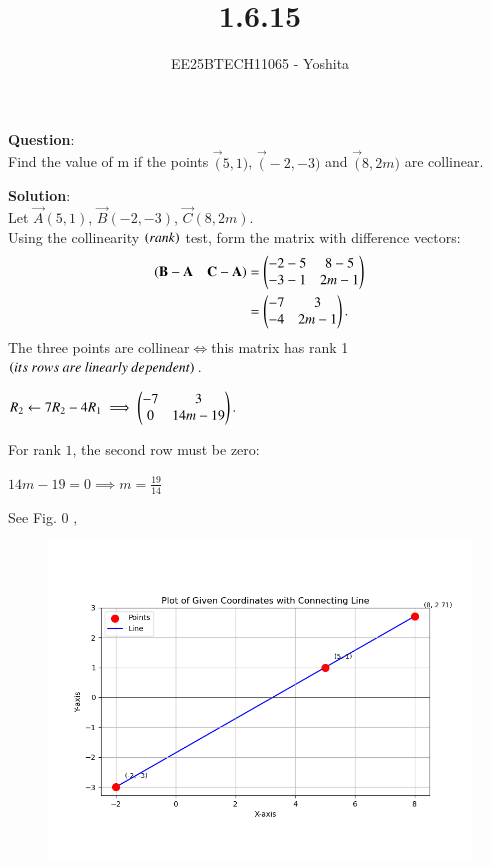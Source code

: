 \documentclass[journal]{IEEEtran}
\begin{document}

\vspace{3cm}

\title{1.6.15}
\author{EE25BTECH11065 - Yoshita}
{\let\newpage\relax\maketitle}

\renewcommand{\thefigure}{\theenumi}
\renewcommand{\thetable}{\theenumi}
\setlength{\intextsep}{10pt} %
\textbf{Question}:\\
    Find the value of m if the points $\vec(5,1)$, $\vec(-2,-3)$ and $\vec(8,2m)$ are collinear.\\
\bigskip

\textbf{Solution}:\\
Let $\vec{A}(5,1)$, $\vec{B}(-2,-3)$, $\vec{C}(8,2m)$.
\\
Using the collinearity $\left(rank\right)$ test, form the matrix with difference vectors:
\begin{align*}
    (\mathbf{B}-\mathbf{A} \quad \mathbf{C}-\mathbf{A}) &= \begin{pmatrix}-2-5 & 8-5 \\ -3-1 & 2m-1\end{pmatrix} \\
    &= \begin{pmatrix}-7 & 3 \\ -4 & 2m-1\end{pmatrix}.
\end{align*}
The three points are collinear$\iff$this matrix has rank 1 $\brak{its\ rows\ are\ linearly\ dependent}$.\\
\begin{center}
 $R_2 \leftarrow 7R_2 - 4R_1 \implies  \begin{pmatrix}-7 & 3 \\ 0 & 14m-19\end{pmatrix}.$
 \end{center}

For rank $1$, the second row must be zero:
\begin{center}
$14m - 19 = 0 \implies m = \frac{19}{14}$
\end{center}
See Fig. 0 ,
\begin{figure}[H]
\begin{center}
\includegraphics[width=0.6\columnwidth]{figs/fig.png}
\end{center}
\caption{}
\label{fig:Fig.1}
\end{figure}
\end{document}
